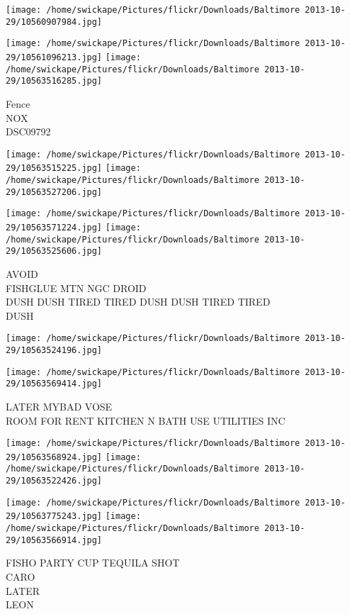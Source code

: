 \documentclass[10pt,letterpaper]{article}
\begin{document}
\texttt{[image: /home/swickape/Pictures/flickr/Downloads/Baltimore 2013-10-29/10560907984.jpg]}

\vspace{0.25in}
\texttt{[image: /home/swickape/Pictures/flickr/Downloads/Baltimore 2013-10-29/10561096213.jpg]}
\texttt{[image: /home/swickape/Pictures/flickr/Downloads/Baltimore 2013-10-29/10563516285.jpg]}

Fence\\
NOX\\
DSC09792\\
\pagebreak

\texttt{[image: /home/swickape/Pictures/flickr/Downloads/Baltimore 2013-10-29/10563515225.jpg]}
\texttt{[image: /home/swickape/Pictures/flickr/Downloads/Baltimore 2013-10-29/10563527206.jpg]}

\texttt{[image: /home/swickape/Pictures/flickr/Downloads/Baltimore 2013-10-29/10563571224.jpg]}
\texttt{[image: /home/swickape/Pictures/flickr/Downloads/Baltimore 2013-10-29/10563525606.jpg]}

AVOID\\
FISHGLUE MTN NGC DROID\\
DUSH DUSH TIRED TIRED DUSH DUSH TIRED TIRED\\
DUSH\\
\pagebreak

\texttt{[image: /home/swickape/Pictures/flickr/Downloads/Baltimore 2013-10-29/10563524196.jpg]}

\vspace{0.25in}
\texttt{[image: /home/swickape/Pictures/flickr/Downloads/Baltimore 2013-10-29/10563569414.jpg]}

LATER MYBAD VOSE\\
ROOM FOR RENT KITCHEN N BATH USE UTILITIES INC\\
\pagebreak

\texttt{[image: /home/swickape/Pictures/flickr/Downloads/Baltimore 2013-10-29/10563568924.jpg]}
\texttt{[image: /home/swickape/Pictures/flickr/Downloads/Baltimore 2013-10-29/10563522426.jpg]}

\texttt{[image: /home/swickape/Pictures/flickr/Downloads/Baltimore 2013-10-29/10563775243.jpg]}
\texttt{[image: /home/swickape/Pictures/flickr/Downloads/Baltimore 2013-10-29/10563566914.jpg]}

FISHO PARTY CUP TEQUILA SHOT\\
CARO\\
LATER\\
LEON\\
\pagebreak
\end{document}
